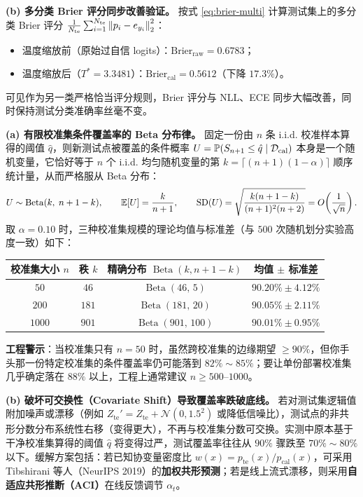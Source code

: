 \textbf{(b) 多分类 Brier 评分同步改善验证。}
按式 \eqref{eq:brier-multi} 计算测试集上的多分类 Brier 评分 $\frac{1}{N_{\text{te}}}\sum_{i=1}^{N_{\text{te}}}\left\|p_i - e_{y_i}\right\|_2^2$：
\begin{itemize}
  \item 温度缩放前（原始过自信 logits）：$\mathrm{Brier}_{\text{raw}} = \mathbf{0.6783}$；
  \item 温度缩放后（$T^* = 3.3481$）：$\mathrm{Brier}_{\text{cal}} = \mathbf{0.5612}$（下降 $17.3\%$）。
\end{itemize}
可见作为另一类严格恰当评分规则，Brier 评分与 NLL、ECE 同步大幅改善，同时保持测试分类准确率丝毫不变。


\textbf{(a) 有限校准集条件覆盖率的 Beta 分布律。}
固定一份由 $n$ 条 i.i.d. 校准样本算得的阈值 $\hat{q}$，则新测试点被覆盖的条件概率 $U = \mathbb{P}(S_{n+1} \le \hat{q} \mid \mathcal{D}_{\text{cal}})$ 本身是一个随机变量，它恰好等于 $n$ 个 i.i.d. 均匀随机变量的第 $k = \lceil(n+1)(1-\alpha)\rceil$ 顺序统计量，从而严格服从 Beta 分布：
\[
  U \sim \operatorname{Beta}(k,\; n + 1 - k), \qquad
  \mathbb{E}[U] = \frac{k}{n + 1}, \qquad
  \operatorname{SD}(U) = \sqrt{\frac{k(n+1-k)}{(n+1)^2(n+2)}} = O\!\left(\frac{1}{\sqrt{n}}\right).
\]
取 $\alpha = 0.10$ 时，三种校准集规模的理论均值与标准差（与 $500$ 次随机划分实验高度一致）如下：
\begin{center}
\footnotesize
\begin{tabular}{cccc}
\toprule
校准集大小 $n$ & 秩 $k$ & 精确分布 $\operatorname{Beta}(k, n+1-k)$ & 均值 $\pm$ 标准差 \\
\midrule
$50$ & $46$ & $\operatorname{Beta}(46,\, 5)$ & $90.20\% \pm \mathbf{4.12\%}$ \\
$200$ & $181$ & $\operatorname{Beta}(181,\, 20)$ & $90.05\% \pm \mathbf{2.11\%}$ \\
$1000$ & $901$ & $\operatorname{Beta}(901,\, 100)$ & $90.01\% \pm \mathbf{0.95\%}$ \\
\bottomrule
\end{tabular}
\end{center}
\textbf{工程警示}：当校准集只有 $n = 50$ 时，虽然跨校准集的边缘期望 $\ge 90\%$，但你手头那一份特定校准集的条件覆盖率仍可能落到 $82\% \sim 85\%$；要让单份部署校准集几乎确定落在 $88\%$ 以上，工程上通常建议 $n \ge 500\text{--}1000$。

\textbf{(b) 破坏可交换性（Covariate Shift）导致覆盖率跌破底线。}
若对测试集逻辑值附加噪声或漂移（例如 $Z_{\text{te}}' = Z_{\text{te}} + \mathcal{N}(0, 1.5^2)$ 或降低信噪比），测试点的非共形分数分布系统性右移（变得更大），不再与校准集分数可交换。实测中原本基于干净校准集算得的阈值 $\hat{q}$ 将变得过严，测试覆盖率往往从 $90\%$ 骤跌至 $70\% \sim 80\%$ 以下。缓解方案包括：若已知协变量密度比 $w(x) = p_{\text{te}}(x)/p_{\text{cal}}(x)$，可采用 Tibshirani 等人（NeurIPS 2019）的\textbf{加权共形预测}；若是线上流式漂移，则采用\textbf{自适应共形推断（ACI）}在线反馈调节 $\alpha_t$。

